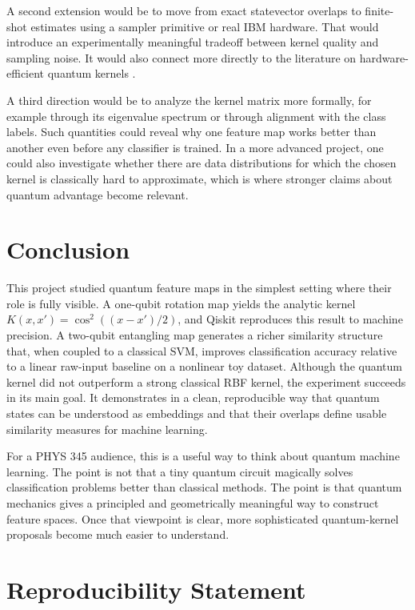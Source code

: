 \documentclass[11pt]{article}
\begin{document}
A second extension would be to move from exact statevector overlaps to finite-shot estimates using a sampler primitive or real IBM hardware. That would introduce an experimentally meaningful tradeoff between kernel quality and sampling noise. It would also connect more directly to the literature on hardware-efficient quantum kernels \cite{havlicek2019feature, qiskitkerneldocs}.

A third direction would be to analyze the kernel matrix more formally, for example through its eigenvalue spectrum or through alignment with the class labels. Such quantities could reveal why one feature map works better than another even before any classifier is trained. In a more advanced project, one could also investigate whether there are data distributions for which the chosen kernel is classically hard to approximate, which is where stronger claims about quantum advantage become relevant.

\section{Conclusion}

This project studied quantum feature maps in the simplest setting where their role is fully visible. A one-qubit rotation map yields the analytic kernel $K(x,x')=\cos^2((x-x')/2)$, and Qiskit reproduces this result to machine precision. A two-qubit entangling map generates a richer similarity structure that, when coupled to a classical SVM, improves classification accuracy relative to a linear raw-input baseline on a nonlinear toy dataset. Although the quantum kernel did not outperform a strong classical RBF kernel, the experiment succeeds in its main goal. It demonstrates in a clean, reproducible way that quantum states can be understood as embeddings and that their overlaps define usable similarity measures for machine learning.

For a PHYS 345 audience, this is a useful way to think about quantum machine learning. The point is not that a tiny quantum circuit magically solves classification problems better than classical methods. The point is that quantum mechanics gives a principled and geometrically meaningful way to construct feature spaces. Once that viewpoint is clear, more sophisticated quantum-kernel proposals become much easier to understand.

\section*{Reproducibility Statement}
\end{document}
